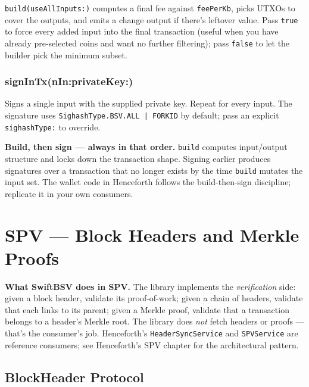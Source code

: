 \documentclass[a4paper, 11pt, openany]{book}
\begin{document}
\texttt{build(useAllInputs:)} computes a final fee against \texttt{feePerKb}, picks UTXOs to cover the outputs, and emits a change output if there's leftover value. Pass \texttt{true} to force every added input into the final transaction (useful when you have already pre-selected coins and want no further filtering); pass \texttt{false} to let the builder pick the minimum subset.

\subsection{signInTx(nIn:privateKey:)}

Signs a single input with the supplied private key. Repeat for every input. The signature uses \texttt{SighashType.BSV.ALL | FORKID} by default; pass an explicit \texttt{sighashType:} to override.

\begin{notebox}
\textbf{Build, then sign --- always in that order.} \texttt{build} computes input/output structure and locks down the transaction shape. Signing earlier produces signatures over a transaction that no longer exists by the time \texttt{build} mutates the input set. The wallet code in Henceforth follows the build-then-sign discipline; replicate it in your own consumers.
\end{notebox}

\chapter{SPV — Block Headers and Merkle Proofs}

\begin{notebox}
\textbf{What SwiftBSV does in SPV.} The library implements the \emph{verification} side: given a block header, validate its proof-of-work; given a chain of headers, validate that each links to its parent; given a Merkle proof, validate that a transaction belongs to a header's Merkle root. The library does \emph{not} fetch headers or proofs --- that's the consumer's job. Henceforth's \texttt{HeaderSyncService} and \texttt{SPVService} are reference consumers; see Henceforth's SPV chapter for the architectural pattern.
\end{notebox}

\section{BlockHeader Protocol}
\end{document}
